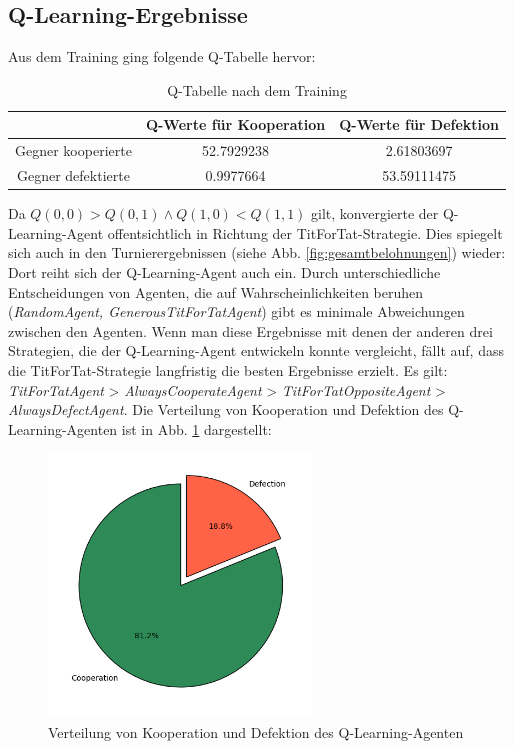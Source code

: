 \subsection{Q-Learning-Ergebnisse}
Aus dem Training ging folgende Q-Tabelle hervor:
\begin{table}[H]
    \centering
    \begin{tabular}{c|c|c}
            & Q-Werte für Kooperation & Q-Werte für Defektion \\
        \hline
        Gegner kooperierte &  52.7929238 & 2.61803697\\
        \hline
        Gegner defektierte &  0.9977664 & 53.59111475 \\
    \end{tabular}
    \caption{Q-Tabelle nach dem Training}
    \label{table:qtableaftertraining}
\end{table}
Da $Q(0, 0) > Q(0, 1) \land Q(1, 0) < Q(1, 1)$ gilt, konvergierte der Q-Learning-Agent offentsichtlich in Richtung der
TitForTat-Strategie. Dies spiegelt sich auch in den Turnierergebnissen (siehe Abb. \ref{fig:gesamtbelohnungen}) wieder:
Dort reiht sich der Q-Learning-Agent auch ein. Durch unterschiedliche Entscheidungen von Agenten, die auf Wahrscheinlichkeiten 
beruhen (\textit{RandomAgent, \textit{GenerousTitForTatAgent}}) gibt es minimale Abweichungen zwischen den Agenten.
Wenn man diese Ergebnisse mit denen der anderen drei Strategien, die der Q-Learning-Agent entwickeln konnte vergleicht,
fällt auf, dass die TitForTat-Strategie langfristig die besten Ergebnisse erzielt. Es gilt:
\textit{TitForTatAgent} > \textit{AlwaysCooperateAgent} > \textit{TitForTatOppositeAgent} > \textit{AlwaysDefectAgent}.
Die Verteilung von Kooperation und Defektion des Q-Learning-Agenten ist in Abb. \ref{fig:qverteilung} dargestellt:
\begin{figure}[H]
    \centering
    \includegraphics[width=7cm]{../poster/logos/qPie.png}
    \caption{Verteilung von Kooperation und Defektion des Q-Learning-Agenten}
    \label{fig:qverteilung}
\end{figure}

